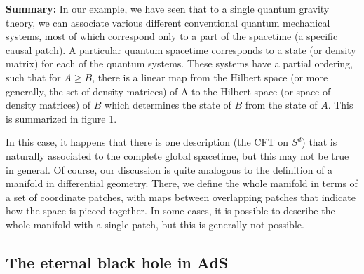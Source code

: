 \documentclass[12pt,epsf]{article}
\renewcommand{\(}{\left(}
\renewcommand{\)}{\right)}
\begin{document}
{\bf Summary:} In our example, we have seen that to a single quantum gravity theory, we can associate various different conventional quantum mechanical systems, most of which correspond only to a part of the spacetime (a specific causal patch). A particular quantum spacetime corresponds to a state (or density matrix) for each of the quantum systems. These systems have a partial ordering, such that for $A \ge B$, there is a linear map from the Hilbert space (or more generally, the set of density matrices) of A to the Hilbert space (or space of density matrices) of $B$ which determines the state of $B$ from the state of $A$. This is summarized in figure 1.

In this case, it happens that there is one description (the CFT on $S^d$) that is naturally associated to the complete global spacetime, but this may not be true in general. Of course, our discussion is quite analogous to the definition of a manifold in differential geometry. There, we define the whole manifold in terms of a set of coordinate patches, with maps between overlapping patches that indicate how the space is pieced together. In some cases, it is possible to describe the whole manifold with a single patch, but this is generally not possible.

\subsection{The eternal black hole in AdS}
\end{document}
